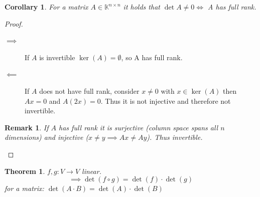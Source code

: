 \documentclass{article}
\newcounter{lecref}[section]
\numberwithin{lecref}{section}
\newtheorem{theorem}[lecref]{Theorem}
\newtheorem{remark}[lecref]{Remark}
\newtheorem{corollary}[lecref]{Corollary}
\begin{document}
\begin{corollary}
  For a matrix $A \in \mathbb K^{n\times n}$ it holds that $\det{A} \neq 0 \iff$ A has full rank.
\end{corollary}

\begin{proof}
  \begin{description}
    \item[$\implies$]
      If $A$ is invertible $\ker(A) = \emptyset$, so A has full rank.
    \item[$\impliedby$] 
      If $A$ does not have full rank, consider $x \neq 0$ with $x \in \operatorname{ker}(A)$ then $Ax = 0$ and $A(2x) = 0$. Thus it is not injective and therefore not invertible.
  \end{description}

  \begin{remark}
    If $A$ has full rank it is surjective (column space spans all $n$ dimensions) and injective ($x \neq y \implies Ax \neq Ay$). Thus invertible.
  \end{remark}
\end{proof}

\begin{theorem} %
  $f, g: V \to V$ linear.
  \[ \implies \det(f \circ g) = \det(f) \cdot \det(g) \]
  for a matrix: $\det(A \cdot B) = \det(A) \cdot \det(B)$
\end{theorem}
\end{document}
